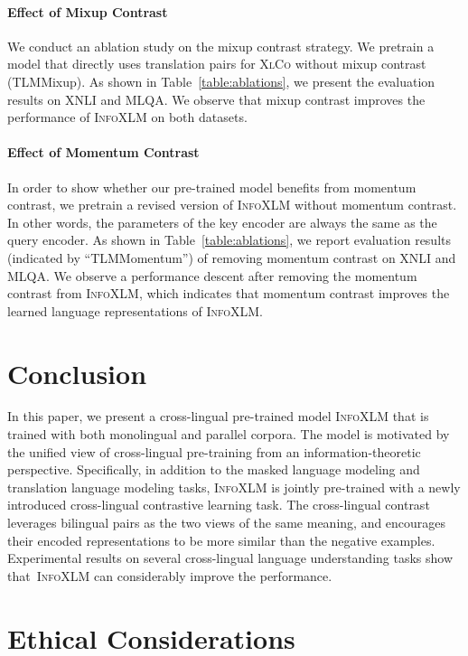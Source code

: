 \documentclass[11pt,a4paper]{article}
\newcommand\our{\textsc{InfoXLM}}
\newcommand\xlco{\textsc{XlCo}}
\begin{document}
\paragraph{Effect of Mixup Contrast}
We conduct an ablation study on the mixup contrast strategy.
We pretrain a model that directly uses translation pairs for \xlco{} without mixup contrast (TLMMixup).
As shown in Table~\ref{table:ablations}, we present the evaluation results on XNLI and MLQA.
We observe that mixup contrast improves the performance of \our{} on both datasets.


\paragraph{Effect of Momentum Contrast}
In order to show whether our pre-trained model benefits from momentum contrast, we pretrain a revised version of \our{} without momentum contrast.
In other words, the parameters of the key encoder are always the same as the query encoder.
As shown in Table~\ref{table:ablations}, we report evaluation results (indicated by ``TLMMomentum'') of removing momentum contrast on XNLI and MLQA.
We observe a performance descent after removing the momentum contrast from \our{}, which indicates that momentum contrast improves the learned language representations of \our{}.


\section{Conclusion}

In this paper, we present a cross-lingual pre-trained model \our{} that is trained with both monolingual and parallel corpora.
The model is motivated by the unified view of cross-lingual pre-training from an information-theoretic perspective.
Specifically, in addition to the masked language modeling and translation language modeling tasks, \our{} is jointly pre-trained with a newly introduced cross-lingual contrastive learning task.
The cross-lingual contrast leverages bilingual pairs as the two views of the same meaning, and encourages their encoded representations to be more similar than the negative examples.
Experimental results on several cross-lingual language understanding tasks show that~\our{} can considerably improve the performance.


\section{Ethical Considerations}
\end{document}
